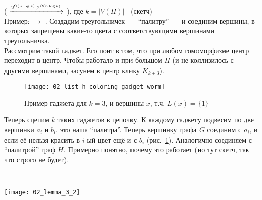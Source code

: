 \begin{reduction}( $\xrightarrow{2^{\Omega(n \log k)}, 2^{\Omega(n \log k)}}$ ), где $k = |V(H)|$~\cite{Cygan2017} (скетч)\\
Пример:  $\to$ . Создадим треугольничек~--- ``палитру''~--- и соединим вершины, в которых запрещены какие-то цвета с соответствующими вершинами треугольничка.\\
Рассмотрим такой гаджет. Его понт в том, что при любом гомоморфизме центр переходит в центр. Чтобы работало и при большом $H$ (и не коллизилось с другими вершинами, засунем в центр клику $K_{k + 3}$).

\begin{figure}[H]
  \centering
  \texttt{[image: 02\_list\_h\_coloring\_gadget\_worm]}
  \caption{Пример гаджета для $k=3$, и вершины $x$, т.ч. $L(x) = \{1 \}$}
  \label{img:list_h_coloring_gadget_worm}
\end{figure}


Теперь сцепим $k$ таких гаджетов в цепочку. К каждому гаджету подвесим по две вершинки $a_i$ и $b_i$, это наша ``палитра''. Теперь вершинку графа $G$ соединим с $a_i$, и если её нельзя красить в $i$-ый цвет ещё и с $b_i$ (рис.~\ref{img:list_h_coloring_gadget_worm}). Аналогично соединяем с ``палитрой'' граф $H$. Примерно понятно, почему это работает (но тут скетч, так что строго не будет).


\end{reduction}


\begin{statement}\label{lm:lemma_3_2}~\cite{Cygan2017} 

\texttt{[image: 02\_lemma\_3\_2]}
    
\end{statement}


